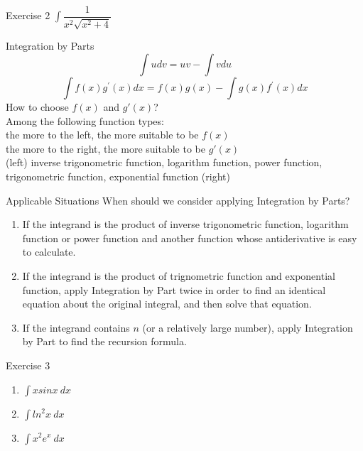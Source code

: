 \begin{frame}{Exercise 2}
    $\int\dfrac{1}{x^2\sqrt{x^2+4}}$
\end{frame}
\begin{frame}{Integration by Parts}
    $$
        \int u d v=u v-\int v d u
    $$
    $$
        \int f(x) g^{\prime}(x) d x=f(x) g(x)-\int g(x) f^{\prime}(x) d x
    $$
    How to choose $f(x)$ and $g'(x)$?\\
    \bigskip
    Among the following function types:\\
    the more to the left, the more suitable to be $f(x)$\\
    the more to the right, the more suitable to be $g'(x)$\\
    \bigskip
    \alert{(left)} inverse trigonometric function, logarithm function, power function, trigonometric function, exponential function \alert{(right)}
\end{frame}
\begin{frame}{Applicable Situations}
    When should we consider applying Integration by Parts?
    \begin{enumerate}
        \item If the integrand is the product of \alert{inverse trigonometric function, logarithm function or power function} and another function \alert{whose antiderivative is easy to calculate}.
        \item If the integrand is the product of \alert{trignometric function and exponential function}, apply Integration by Part twice in order to find an identical equation about the original integral, and then solve that equation.
        \item If the integrand contains $n$ (or a relatively large number), apply Integration by Part to \alert{find the recursion formula}.
    \end{enumerate}
\end{frame}

\begin{frame}{Exercise 3}
    \begin{enumerate}
        \item $\int xsinx\ dx$
              \bigskip
        \item $\int ln^2x\ dx$
              \bigskip
        \item $\int x^2e^x\ dx$
    \end{enumerate}
\end{frame}


